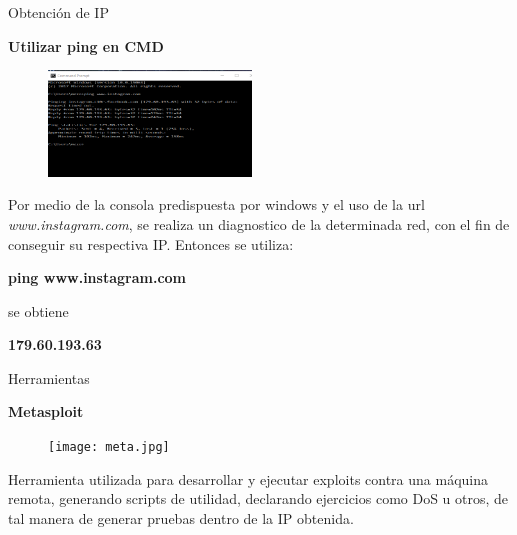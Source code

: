 \begin{frame}[t,fragile]{Obtención de IP}

\textbf{Utilizar ping en CMD}

\begin{figure} 
\vspace{2pt}
  \begin{center}
    \includegraphics[width=0.48\textwidth]{pinginstagram.png}
    \label{fig:databaseUserTable}
  \end{center}
  \vspace{2pt}
\end{figure} 

\bigskip

Por medio de la consola predispuesta por windows y el uso de la url \emph{www.instagram.com}, se realiza un diagnostico de la determinada red, con el fin de conseguir su respectiva IP. 
Entonces se utiliza:

\begin{center}
   \textbf{ping www.instagram.com}
\end{center}

se obtiene

\begin{center}
   \textbf{179.60.193.63}
\end{center}





\end{frame}



\begin{frame}[t,fragile]{Herramientas}

\textbf{Metasploit}

\begin{figure} 
\vspace{2pt}
  \begin{center}
    \texttt{[image: meta.jpg]}
    \label{fig:databaseUserTable}
  \end{center}
  \vspace{2pt}
\end{figure} 

\bigskip

 Herramienta  utilizada para desarrollar y ejecutar exploits contra una máquina remota, generando scripts de utilidad, declarando ejercicios como DoS u otros, de tal manera de generar pruebas dentro de la IP obtenida.


\end{frame}

